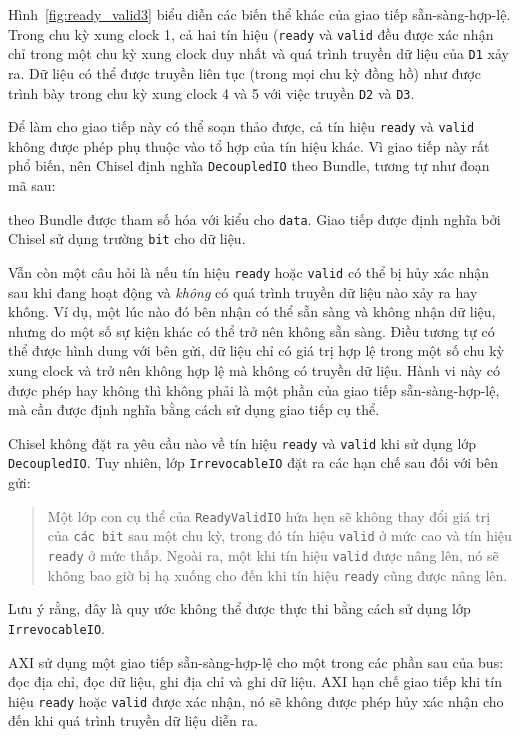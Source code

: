 \documentclass[%
    10pt,
    headinclude, footexclude,
    openright, %
    notitlepage,
    cleardoubleempty,
    headsepline,
    pointlessnumbers,
    bibtotoc, idxtotoc,
    ]{scrbook}
\newcommand{\code}[1]{{\small{\texttt{#1}}}}
\begin{document}
Hình~\ref{fig:ready_valid3} biểu diễn các biến thể khác của giao tiếp sẵn-sàng-hợp-lệ. Trong chu kỳ xung clock 1, cả hai tín hiệu (\code{ready} và \code{valid} đều được xác nhận chỉ trong một chu kỳ xung clock duy nhất và quá trình truyền dữ liệu của \code{D1} xảy ra. Dữ liệu có thể được truyền liên tục (trong mọi chu kỳ đồng hồ) như được trình bày trong chu kỳ xung clock 4 và 5 với việc truyền \code{D2} và \code{D3}.

Để làm cho giao tiếp này có thể soạn thảo được, cả tín hiệu \code {ready} và \code{valid} không được phép phụ thuộc vào tổ hợp của tín hiệu khác. Vì giao tiếp này rất phổ biến, nên Chisel định nghĩa \code{DecoupledIO} theo Bundle, tương tự như đoạn mã sau: 


\noindent \code{DecoupledIO} theo Bundle được tham số hóa với kiểu cho \code{data}. Giao tiếp được định nghĩa bởi Chisel sử dụng trường \code{bit} cho dữ liệu.

Vẫn còn một câu hỏi là nếu tín hiệu \code{ready} hoặc \code{valid} có thể bị hủy xác nhận sau khi đang hoạt động và \emph{không} có quá trình truyền dữ liệu nào xảy ra hay không. Ví dụ, một lúc nào đó bên nhận có thể sẵn sàng và không nhận dữ liệu, nhưng do một số sự kiện khác có thể trở nên không sẵn sàng. Điều tương tự có thể được hình dung với bên gửi, dữ liệu chỉ có giá trị hợp lệ trong một số chu kỳ xung clock và trở nên không hợp lệ mà không có truyền dữ liệu. Hành vi này có được phép hay không thì không phải là một phần của giao tiếp sẵn-sàng-hợp-lệ, mà cần được định nghĩa bằng cách sử dụng giao tiếp cụ thể.

Chisel không đặt ra yêu cầu nào về tín hiệu \code{ready} và \code{valid} khi sử dụng lớp \code{DecoupledIO}. Tuy nhiên, lớp \code{IrrevocableIO} đặt ra các hạn chế sau đối với bên gửi:

\begin{quote}
Một lớp con cụ thể của \code{ReadyValidIO} hứa hẹn sẽ không thay đổi giá trị của \code{các bit} sau một chu kỳ, trong đó tín hiệu \code{valid} ở mức cao và tín hiệu \code{ready} ở mức thấp. Ngoài ra, một khi tín hiệu \code{valid} được nâng lên, nó sẽ không bao giờ bị hạ xuống cho đến khi tín hiệu \code{ready} cũng được nâng lên. 
\end{quote}

\noindent Lưu ý rằng, đây là quy ước không thể được thực thi bằng cách sử dụng lớp \code{IrrevocableIO}.

AXI sử dụng một giao tiếp sẵn-sàng-hợp-lệ cho một trong các phần sau của bus: đọc địa chỉ, đọc dữ liệu, ghi địa chỉ và ghi dữ liệu. AXI hạn chế giao tiếp khi tín hiệu \code{ready} hoặc \code{valid} được xác nhận, nó sẽ không được phép hủy xác nhận cho đến khi quá trình truyền dữ liệu diễn ra. 
\end{document}
